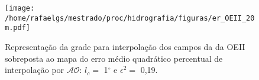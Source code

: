 \begin{figure}%
 \begin{center}
  \texttt{[image: /home/rafaelgs/mestrado/proc/hidrografia/figuras/er\_OEII\_20m.pdf]}
 \end{center}
 \vspace{-.25cm}
 \renewcommand{\baselinestretch}{1}
 \caption{\label{fig:grades_oeii} \small Representação da grade para interpolação dos campos da 
 da OEII sobreposta ao mapa do erro médio quadrático percentual de interpolação por 
 $\mathcal{AO}$: $l_c =$ 1$^\circ$ e $\epsilon^{2} =$ 0,19.}
\end{figure}

%   
